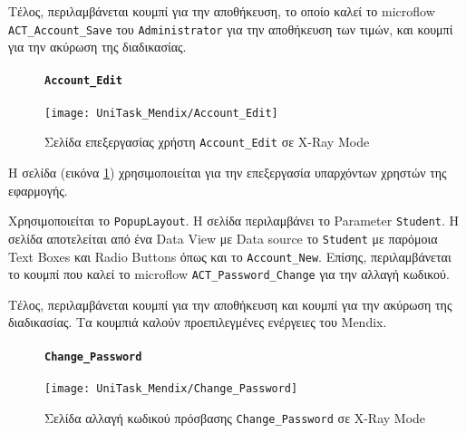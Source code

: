                     Τέλος, περιλαμβάνεται κουμπί για την αποθήκευση, το οποίο καλεί το microflow \texttt{ACT\_Account\_Save} του \texttt{Administrator} για την αποθήκευση των τιμών, και κουμπί για την ακύρωση της διαδικασίας.

                \begin{figure}[H] \noindent
                    \paragraph{\texttt{Account\_Edit}}
                    \begin{center}
                        \texttt{[image: UniTask\_Mendix/Account\_Edit]}
                        \caption{\centering Σελίδα επεξεργασίας χρήστη \texttt{Account\_Edit} σε X-Ray Mode}
                        \label{fig:unitask_Account_Edit}
                    \end{center}
                \end{figure}

                    Η σελίδα (εικόνα \ref{fig:unitask_Account_Edit}) χρησιμοποιείται για την επεξεργασία υπαρχόντων χρηστών της εφαρμογής.

                    Χρησιμοποιείται το \texttt{PopupLayout}. Η σελίδα περιλαμβάνει το Parameter \texttt{Student}. Η σελίδα αποτελείται από ένα Data View με Data source το \texttt{Student} με παρόμοια Text Boxes και Radio Buttons όπως και το \texttt{Account\_New}. Επίσης, περιλαμβάνεται το κουμπί που καλεί το microflow \texttt{ACT\_Password\_Change} για την αλλαγή κωδικού.

                    Τέλος, περιλαμβάνεται κουμπί για την αποθήκευση και κουμπί για την ακύρωση της διαδικασίας. Τα κουμπιά καλούν προεπιλεγμένες ενέργειες του Mendix.

                \newpage

                \begin{figure}[H] \noindent
                    \paragraph{\texttt{Change\_Password}}
                    \begin{center}
                        \texttt{[image: UniTask\_Mendix/Change\_Password]}
                        \caption{\centering Σελίδα αλλαγή κωδικού πρόσβασης \texttt{Change\_Password} σε X-Ray Mode}
                        \label{fig:unitask_Change_Password}
                    \end{center}
                \end{figure}

